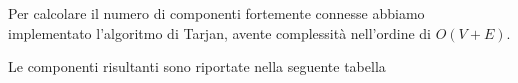 \documentclass{report}
\begin{document}
Per calcolare il numero di componenti fortemente connesse abbiamo implementato l'algoritmo di Tarjan, avente complessità nell'ordine di $O(V+E)$.

Le componenti risultanti sono riportate nella seguente tabella

\begin{table} [!htb]
\centering
{}
\end{table}
\end{document}
